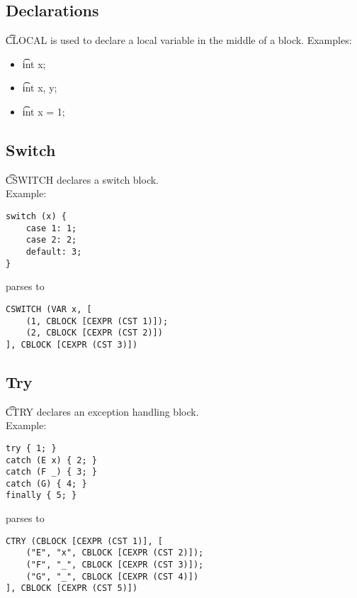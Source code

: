 \subsection{Declarations}
\t{CLOCAL} is used to declare a local variable in the middle of a block.
Examples:
\begin{itemize}
    \item \t{int x;} \to\ 
    \item \t{int x, y;} \to\ 
    \item \t{int x = 1;} \to\ 
\end{itemize}

\subsection{Switch}
\t{CSWITCH} declares a switch block.\\
Example:
\begin{verbatim}
switch (x) {
    case 1: 1;
    case 2: 2;
    default: 3;
}
\end{verbatim}
parses to
\begin{verbatim}
CSWITCH (VAR x, [
    (1, CBLOCK [CEXPR (CST 1)]);
    (2, CBLOCK [CEXPR (CST 2)])
], CBLOCK [CEXPR (CST 3)])
\end{verbatim}

\subsection{Try}
\t{CTRY} declares an exception handling block.\\
Example:
\begin{verbatim}
try { 1; }
catch (E x) { 2; }
catch (F _) { 3; }
catch (G) { 4; }
finally { 5; }
\end{verbatim}
parses to
\begin{verbatim}
CTRY (CBLOCK [CEXPR (CST 1)], [
    ("E", "x", CBLOCK [CEXPR (CST 2)]);
    ("F", "_", CBLOCK [CEXPR (CST 3)]);
    ("G", "_", CBLOCK [CEXPR (CST 4)])
], CBLOCK [CEXPR (CST 5)])
\end{verbatim}


